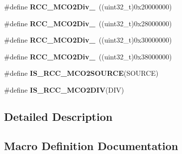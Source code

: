 \begin{DoxyCompactItemize}
\item 
\hypertarget{group___r_c_c___m_c_o2___clock___source___prescaler_gac64afcfec90f2783fd78887e8a783ecb}{}\#define {\bfseries R\+C\+C\+\_\+\+M\+C\+O2\+Div\+\_}~((uint32\+\_\+t)0x20000000)\label{group___r_c_c___m_c_o2___clock___source___prescaler_gac64afcfec90f2783fd78887e8a783ecb}

\item 
\hypertarget{group___r_c_c___m_c_o2___clock___source___prescaler_gad94c96c38025e6a5164bc277d87173a6}{}\#define {\bfseries R\+C\+C\+\_\+\+M\+C\+O2\+Div\+\_}~((uint32\+\_\+t)0x28000000)\label{group___r_c_c___m_c_o2___clock___source___prescaler_gad94c96c38025e6a5164bc277d87173a6}

\item 
\hypertarget{group___r_c_c___m_c_o2___clock___source___prescaler_ga3ff14a7e8bb898eadf24d879ee41069f}{}\#define {\bfseries R\+C\+C\+\_\+\+M\+C\+O2\+Div\+\_}~((uint32\+\_\+t)0x30000000)\label{group___r_c_c___m_c_o2___clock___source___prescaler_ga3ff14a7e8bb898eadf24d879ee41069f}

\item 
\hypertarget{group___r_c_c___m_c_o2___clock___source___prescaler_gac47804a0bf27b079a23dd532d5482cf9}{}\#define {\bfseries R\+C\+C\+\_\+\+M\+C\+O2\+Div\+\_}~((uint32\+\_\+t)0x38000000)\label{group___r_c_c___m_c_o2___clock___source___prescaler_gac47804a0bf27b079a23dd532d5482cf9}

\item 
\#define {\bfseries I\+S\+\_\+\+R\+C\+C\+\_\+\+M\+C\+O2\+S\+O\+U\+R\+C\+E}(S\+O\+U\+R\+C\+E)
\item 
\#define {\bfseries I\+S\+\_\+\+R\+C\+C\+\_\+\+M\+C\+O2\+D\+I\+V}(D\+I\+V)
\end{DoxyCompactItemize}


\subsection{Detailed Description}


\subsection{Macro Definition Documentation}
\hypertarget{group___r_c_c___m_c_o2___clock___source___prescaler_gab28570d78a518bc83f82a96e7b0b8a73}{}
